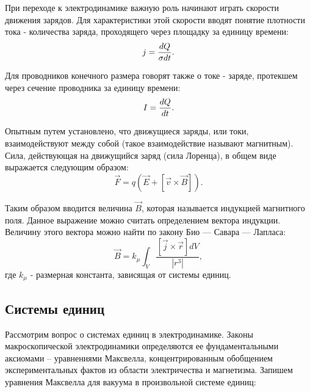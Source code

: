 При переходе к электродинамике важную роль начинают играть скорости движения зарядов. Для характеристики этой скорости вводят понятие плотности тока - количества заряда, проходящего через площадку за единицу времени:
\begin{equation}
	\eqmark
	j = \frac{dQ}{\sigma dt}.
\end{equation}

Для проводников конечного размера говорят также о токе - заряде, протекшем через сечение проводника за единицу времени:
\begin{equation}
	\eqmark[current]
	I = \frac{dQ}{dt}.
\end{equation}

Опытным путем установлено, что движущиеся заряды, или токи, взаимодействуют между собой (такое взаимодействие называют магнитным). Сила, действующая на движущийся заряд (сила Лоренца), в общем виде выражается следующим образом:
\begin{equation}
	\vec{F} = q \left( \vec{E} + \left[ \vec{v} \times \vec{B}\right] \right).
\end{equation}

Таким образом вводится величина $\vec{B}$, которая называется индукцией магнитного поля. Данное выражение можно считать определением вектора индукции. Величину этого вектора можно найти по закону Био — Савара — Лапласа:
\begin{equation}
	\vec{B} = k_{\mu}\int_{V}{\frac{\left[ \vec{j} \times \vec{r}\right] dV}{\left| r^3 \right| }},
\end{equation}
где $k_{\mu}$ - размерная константа, зависящая от системы единиц.

\subsection{Системы единиц}

Рассмотрим вопрос о системах единиц в электродинамике. Законы макроскопической электродинамики определяются ее фундаментальными аксиомами -- уравнениями Максвелла, концентрированным обобщением экспериментальных фактов из области электричества и магнетизма. Запишем уравнения Максвелла для вакуума в произвольной системе единиц:



